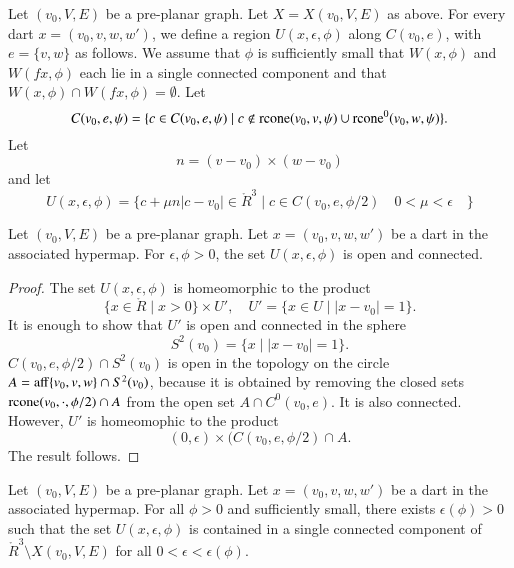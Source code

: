 Let $(v_0,V,E)$ be a pre-planar graph.  Let $X=X(v_0,V,E)$ as above. For
every dart $x=(v_0,v,w,w')$, we define a region $U(x,\epsilon,\phi)$ along
$C(v_0,e)$, with $e = \{v,w\}$ as follows. 
We assume that $\phi$ is sufficiently small that $W(x,\phi)$
and $W(f x,\phi)$ each lie in a single connected component and
that $W(x,\phi)\cap W(f x,\phi) =\emptyset$.
Let 
  $$C(v_0,e,\psi) =
    \{ c\in C(v_0,e,\psi) \mid c\not\in {\operatorname{rcone}}(v_0,v,\psi)
    \cup{\operatorname{rcone}}^0(v_0,w,\psi)\}.
  $$
Let 
  $$n = (v-v_0)\times (w-v_0)$$
and let
  $$
  U(x,\epsilon,\phi) = \{ c + \mu n |c-v_0| \in \ring{R}^3 \mid
     c\in C(v_0,e,\phi/2)\quad
     0 < \mu < \epsilon\quad 
     \}
  $$

\begin{lemma}  Let $(v_0,V,E)$ be a pre-planar graph.
Let $x=(v_0,v,w,w')$ be a dart in the associated hypermap.
For $\epsilon,\phi > 0$, the set $U(x,\epsilon,\phi)$ is
open and connected.
\end{lemma}

\begin{proof}  The set 
$U(x,\epsilon,\phi)$ is homeomorphic to the product
  $$
  \{x \in\ring{R}\mid x > 0\} \times U',\quad
  U' = \{x \in U \mid |x-v_0| = 1\}.
  $$
It is enough to show that $U'$ is open and connected in
the sphere $$S^2(v_0) = \{x\mid |x-v_0|=1\}.$$
$C(v_0,e,\phi/2) \cap S^2(v_0)$ is open in the
topology on the circle $A={\operatorname{aff}}\{v_0,v,w\}\cap S^2(v_0)$, 
because it is
obtained by removing the closed sets ${\operatorname{rcone}}(v_0,\cdot,\phi/2)\cap A$ from the open set $A\cap C^0(v_0,e)$.
It is also connected.   However, $U'$ is homeomophic to the
product
  $$
  (0,\epsilon) \times (C(v_0,e,\phi/2) \cap A.
  $$
The result follows.
\end{proof}

\begin{lemma}
Let $(v_0,V,E)$ be a pre-planar graph.
Let $x=(v_0,v,w,w')$ be a dart in the associated hypermap.
For all $\phi > 0$ and sufficiently small, there exists
$\epsilon(\phi)>0$ such that
the set $U(x,\epsilon,\phi)$ is
contained in a single connected component of $\ring{R}^3\setminus
X(v_0,V,E)$ for all $0 < \epsilon <\epsilon(\phi)$.
\end{lemma}

